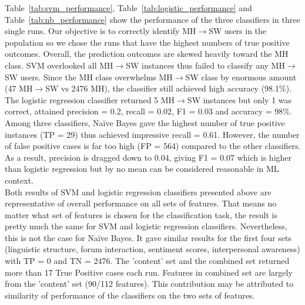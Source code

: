 Table~\ref{tab:svm_performance}, Table~\ref{tab:logistic_performance} and Table~\ref{tab:nb_performance} show the performance of the three classifiers in three single runs. Our objective is to correctly identify MH$\rightarrow$SW users in the population so we chose the runs that have the highest numbers of true positive outcomes. Overall, the prediction outcomes are skewed heavily toward the MH class. SVM overlooked all MH$\rightarrow$SW instances thus failed to classify any MH$\rightarrow$SW users. Since the MH class overwhelms MH$\rightarrow$SW class by enormous amount (47 MH$\rightarrow$SW  vs 2476 MH), the classifier still achieved high accuracy (98.1\%). The logistic regression classifier returned 5 MH$\rightarrow$SW instances but only 1 was correct, attained precision = 0.2, recall = 0.02, F1 = 0.03 and accuracy = 98\%. Among three classifiers, Na\"ive Bayes gave the highest number of true positive instances (TP = 29) thus achieved impressive recall = 0.61. However, the number of false positive cases is far too high (FP = 564) compared to the other classifiers. As a result, precision is dragged down to 0.04, giving F1 = 0.07 which is higher than logistic regression but by no mean can be considered reasonable in ML context.\\
Both results of SVM and logistic regression classifiers presented above are representative of overall performance on all sets of features. That means no matter what set of features is chosen for the classification task, the result is pretty much the same for SVM and logistic regression classifiers. Nevertheless, this is not the case for Na\"ive Bayes. It gave similar results for the first four sets (linguistic structure, forum interaction, sentiment scores, interpersonal awareness) with  TP = 0 and TN = 2476. The 'content' set and the combined set returned more than 17 True Positive cases each run. Features in combined set are largely from the 'content' set (90/112 features). This contribution may be attributed to similarity of performance of the classifiers on the two sets of features.\\ 
